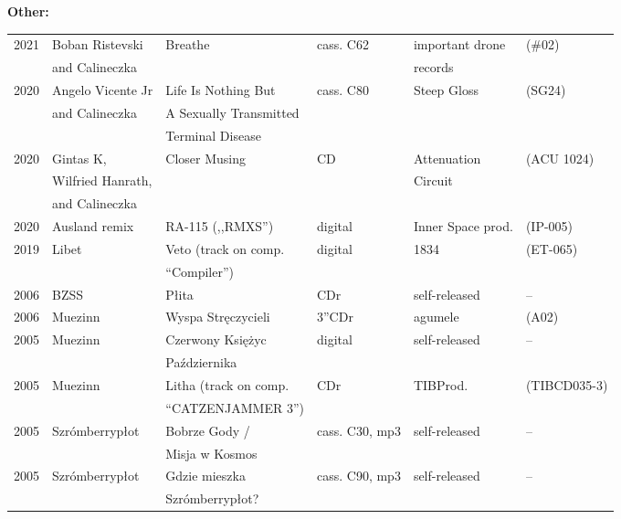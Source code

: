 \documentclass[a4paper]{article}
\begin{document}
\vspace{11mm}

\newpage

\textbf{Other:}

\vspace{2mm}

\begin{tabularx}{\textwidth}{l l l l l l}
\hline
2021 & Boban Ristevski & Breathe & cass. C62 & important drone & (\#02)\\
     & and Calineczka  &         &           & records         & \\
\hline
2020 & Angelo Vicente Jr & Life Is Nothing But & cass. C80 & Steep Gloss & (SG24) \\
     & and Calineczka & A Sexually Transmitted & & & \\
     &                & Terminal Disease       & & &  \\
\hline
2020 & Gintas K,         & Closer Musing & CD & Attenuation & (ACU 1024) \\
     & Wilfried Hanrath, &               &    & Circuit & \\
     & and Calineczka    &               &    & & \\
\hline
2020 & Ausland remix & RA-115 (,,RMXS'') & digital & Inner Space prod. & (IP-005) \\
\hline
2019 & Libet & Veto (track on comp. & digital & 1834 & (ET-065) \\
     &       & ``Compiler'')        &         &      & \\
\hline
2006 & BZSS & Płita & CDr & self-released & -- \\
\hline
2006 & Muezinn & Wyspa Stręczycieli & 3''CDr & agumele & (A02)\\
\hline
2005 & Muezinn & Czerwony Księżyc & digital & self-released & -- \\
     &         & Października     &         & & \\
\hline
2005 & Muezinn & Litha (track on comp.& CDr & TIBProd. &  (TIBCD035-3)\\
     &         & ``CATZENJAMMER 3'') & & & \\
\hline
2005 & Szrómberrypłot & Bobrze Gody / & cass. C30, mp3 & self-released & -- \\
     &                & Misja w Kosmos & & &\\
\hline
2005 & Szrómberrypłot & Gdzie mieszka  & cass. C90, mp3 & self-released & -- \\
     &                & Szrómberrypłot? & & & \\
\end{tabularx}
\end{document}
